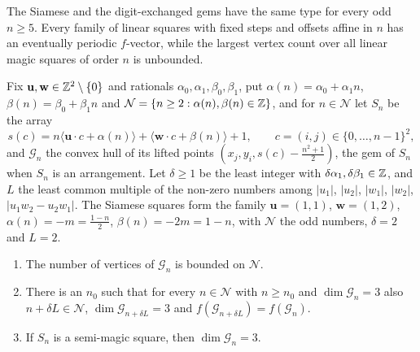 The Siamese and the digit-exchanged gems have the same type for every odd $n\ge5$.
Every family of linear squares with fixed steps and offsets affine in $n$ has an eventually periodic $f$-vector, while the largest vertex count over all linear magic squares of order $n$ is unbounded.

Fix $\mathbf u,\mathbf w\in\mathbb{Z}^2\setminus\{0\}$ and rationals $\alpha_0,\alpha_1,\beta_0,\beta_1$, put $\alpha(n)=\alpha_0+\alpha_1n$, $\beta(n)=\beta_0+\beta_1n$ and $\mathcal N=\{n\ge2:\alpha(n),\beta(n)\in\mathbb{Z}\}$, and for $n\in\mathcal N$ let $S_n$ be the array
\[
s(c)=n\langle\mathbf u\cdot c+\alpha(n)\rangle+\langle\mathbf w\cdot c+\beta(n)\rangle+1,\qquad c=(i,j)\in\{0,\dots,n-1\}^2,
\]
and $\mathcal G_n$ the convex hull of its lifted points $(x_j,y_i,s(c)-\frac{n^2+1}2)$, the gem of $S_n$ when $S_n$ is an arrangement.
Let $\delta\ge1$ be the least integer with $\delta\alpha_1,\delta\beta_1\in\mathbb{Z}$, and $L$ the least common multiple of the non-zero numbers among $|u_1|$, $|u_2|$, $|w_1|$, $|w_2|$, $|u_1w_2-u_2w_1|$.
The Siamese squares form the family $\mathbf u=(1,1)$, $\mathbf w=(1,2)$, $\alpha(n)=-m=\frac{1-n}2$, $\beta(n)=-2m=1-n$, with $\mathcal N$ the odd numbers, $\delta=2$ and $L=2$.

\begin{proposition}
\label{prop:fixed-steps}
\begin{enumerate}
\item[(a)] The number of vertices of $\mathcal G_n$ is bounded on $\mathcal N$.
\item[(b)] There is an $n_0$ such that for every $n\in\mathcal N$ with $n\ge n_0$ and $\dim\mathcal G_n=3$ also $n+\delta L\in\mathcal N$, $\dim\mathcal G_{n+\delta L}=3$ and $f(\mathcal G_{n+\delta L})=f(\mathcal G_n)$.
\item[(c)] If $S_n$ is a semi-magic square, then $\dim\mathcal G_n=3$.
\end{enumerate}
\end{proposition}

